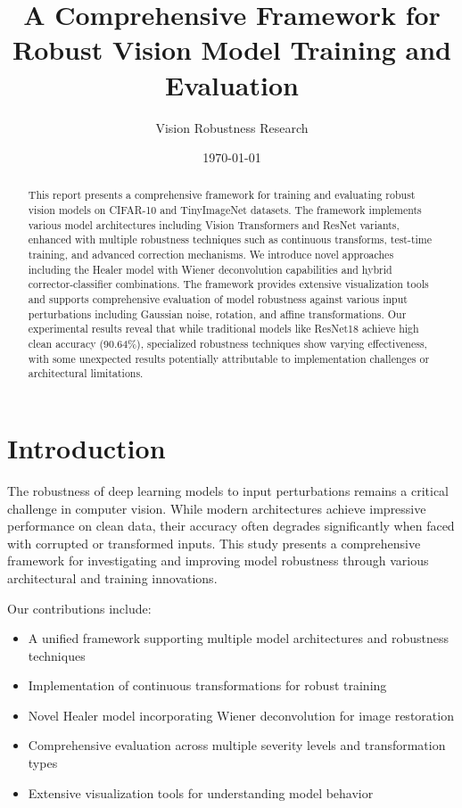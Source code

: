 \documentclass[11pt,a4paper]{article}
\title{A Comprehensive Framework for Robust Vision Model Training and Evaluation}
\author{Vision Robustness Research}
\date{\today}
\begin{document}
\maketitle

\begin{abstract}
This report presents a comprehensive framework for training and evaluating robust vision models on CIFAR-10 and TinyImageNet datasets. The framework implements various model architectures including Vision Transformers and ResNet variants, enhanced with multiple robustness techniques such as continuous transforms, test-time training, and advanced correction mechanisms. We introduce novel approaches including the Healer model with Wiener deconvolution capabilities and hybrid corrector-classifier combinations. The framework provides extensive visualization tools and supports comprehensive evaluation of model robustness against various input perturbations including Gaussian noise, rotation, and affine transformations. Our experimental results reveal that while traditional models like ResNet18 achieve high clean accuracy (90.64\%), specialized robustness techniques show varying effectiveness, with some unexpected results potentially attributable to implementation challenges or architectural limitations.
\end{abstract}

\section{Introduction}

The robustness of deep learning models to input perturbations remains a critical challenge in computer vision. While modern architectures achieve impressive performance on clean data, their accuracy often degrades significantly when faced with corrupted or transformed inputs. This study presents a comprehensive framework for investigating and improving model robustness through various architectural and training innovations.

Our contributions include:
\begin{itemize}
    \item A unified framework supporting multiple model architectures and robustness techniques
    \item Implementation of continuous transformations for robust training
    \item Novel Healer model incorporating Wiener deconvolution for image restoration
    \item Comprehensive evaluation across multiple severity levels and transformation types
    \item Extensive visualization tools for understanding model behavior
\end{itemize}
\end{document}
